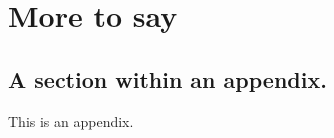\documentclass[12pt]{report}
\begin{document}

\appendix

\chapter{More to say}

\section{A section within an appendix.}
This is an appendix.




\singlespacing

%
%
%





%

%
\end{document}
